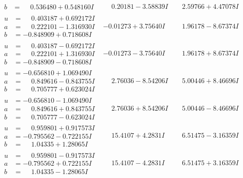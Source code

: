 \documentclass[1p]{elsarticle_modified}
\theoremstyle{definition}
\begin{document}
$$\begin{array}{c|c|c}
\begin{aligned}
b &= \phantom{-}0.536480 + 0.548160 I\end{aligned}
 & \phantom{-}0.20181 - 3.58839 I & \phantom{-}2.59766 + 4.47078 I \\ \hline\begin{aligned}
u &= \phantom{-}0.403187 + 0.692172 I \\
a &= \phantom{-}0.222101 - 1.316930 I \\
b &= -0.848909 + 0.718608 I\end{aligned}
 & -0.01273 + 3.75640 I & \phantom{-}1.96178 - 8.67374 I \\ \hline\begin{aligned}
u &= \phantom{-}0.403187 - 0.692172 I \\
a &= \phantom{-}0.222101 + 1.316930 I \\
b &= -0.848909 - 0.718608 I\end{aligned}
 & -0.01273 - 3.75640 I & \phantom{-}1.96178 + 8.67374 I \\ \hline\begin{aligned}
u &= -0.656810 + 1.069490 I \\
a &= \phantom{-}0.849616 - 0.843755 I \\
b &= \phantom{-}0.705777 + 0.623024 I\end{aligned}
 & \phantom{-}2.76036 - 8.54206 I & \phantom{-}5.00446 + 8.46696 I \\ \hline\begin{aligned}
u &= -0.656810 - 1.069490 I \\
a &= \phantom{-}0.849616 + 0.843755 I \\
b &= \phantom{-}0.705777 - 0.623024 I\end{aligned}
 & \phantom{-}2.76036 + 8.54206 I & \phantom{-}5.00446 - 8.46696 I \\ \hline\begin{aligned}
u &= \phantom{-}0.959801 + 0.917573 I \\
a &= -0.795562 - 0.722155 I \\
b &= \phantom{-}1.04335 + 1.28065 I\end{aligned}
 & \phantom{-}15.4107 + 4.2831 I & \phantom{-}6.51475 - 3.16359 I \\ \hline\begin{aligned}
u &= \phantom{-}0.959801 - 0.917573 I \\
a &= -0.795562 + 0.722155 I \\
b &= \phantom{-}1.04335 - 1.28065 I\end{aligned}
 & \phantom{-}15.4107 - 4.2831 I & \phantom{-}6.51475 + 3.16359 I \\ \hline\begin{aligned}

\end{aligned}
\end{array}$$
\end{document}
